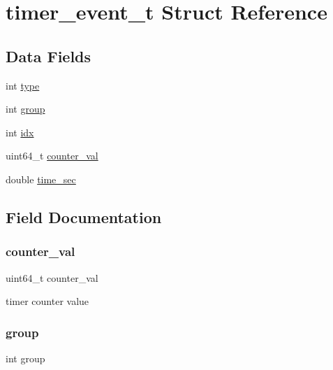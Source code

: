 \hypertarget{structtimer__event__t}{}\section{timer\+\_\+event\+\_\+t Struct Reference}
\label{structtimer__event__t}
\subsection*{Data Fields}
\begin{DoxyCompactItemize}
\item 
int \hyperlink{structtimer__event__t_ac765329451135abec74c45e1897abf26}{type}
\item 
int \hyperlink{structtimer__event__t_a0242027ec3331f3d5793c42d21b6f4e1}{group}
\item 
int \hyperlink{structtimer__event__t_ae40354a1051342eb5a9db005715dcfa9}{idx}
\item 
uint64\+\_\+t \hyperlink{structtimer__event__t_a39b3033908e7ae3ac9746647e3051c62}{counter\+\_\+val}
\item 
double \hyperlink{structtimer__event__t_ad7f20d4511a6cb098642a8c1868f8368}{time\+\_\+sec}
\end{DoxyCompactItemize}


\subsection{Field Documentation}
\mbox{\label{structtimer__event__t_a39b3033908e7ae3ac9746647e3051c62}} 
\subsubsection{\texorpdfstring{counter\+\_\+val}{counter\_val}}
{\footnotesize\ttfamily uint64\+\_\+t counter\+\_\+val}

timer counter value \mbox{\label{structtimer__event__t_a0242027ec3331f3d5793c42d21b6f4e1}} 
\subsubsection{\texorpdfstring{group}{group}}
{\footnotesize\ttfamily int group}

